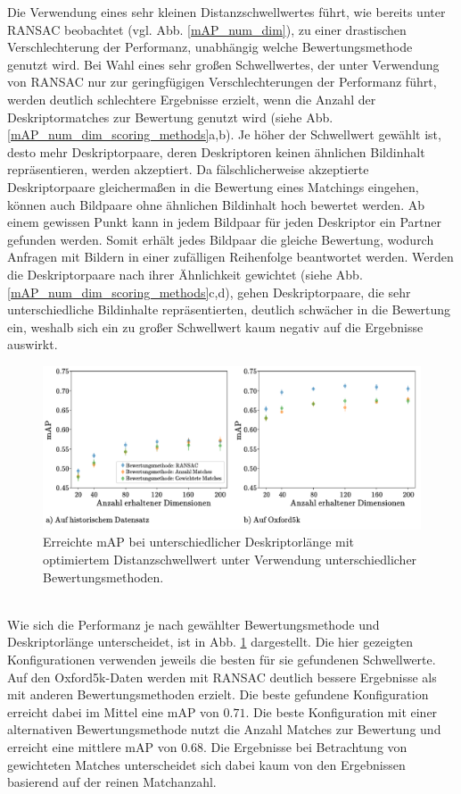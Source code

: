 Die Verwendung eines sehr kleinen Distanzschwellwertes führt, wie bereits unter RANSAC beobachtet (vgl. Abb. \ref{mAP_num_dim}), zu einer drastischen Verschlechterung der Performanz, unabhängig welche Bewertungsmethode genutzt wird. Bei Wahl eines sehr großen Schwellwertes, der unter Verwendung von RANSAC nur zur geringfügigen Verschlechterungen der Performanz führt, werden deutlich schlechtere Ergebnisse erzielt, wenn die Anzahl der Deskriptormatches zur Bewertung genutzt wird (siehe Abb. \ref{mAP_num_dim_scoring_methods}a,b). Je höher der Schwellwert gewählt ist, desto mehr Deskriptorpaare, deren Deskriptoren keinen ähnlichen Bildinhalt repräsentieren, werden akzeptiert. Da fälschlicherweise akzeptierte Deskriptorpaare gleichermaßen in die Bewertung eines Matchings eingehen, können auch Bildpaare ohne ähnlichen Bildinhalt hoch bewertet werden. Ab einem gewissen Punkt kann in jedem Bildpaar für jeden Deskriptor ein Partner gefunden werden. Somit erhält jedes Bildpaar die gleiche Bewertung, wodurch Anfragen mit Bildern in einer zufälligen Reihenfolge beantwortet werden. Werden die Deskriptorpaare nach ihrer Ähnlichkeit gewichtet (siehe Abb. \ref{mAP_num_dim_scoring_methods}c,d), gehen Deskriptorpaare, die sehr unterschiedliche Bildinhalte repräsentierten, deutlich schwächer in die Bewertung ein, weshalb sich ein zu großer Schwellwert kaum negativ auf die Ergebnisse auswirkt.
\begin{figure}[h]
\includegraphics[scale=0.74]{compare_scoring_methods}
\caption{Erreichte mAP bei unterschiedlicher Deskriptorlänge mit optimiertem Distanzschwellwert unter Verwendung unterschiedlicher Bewertungsmethoden.}
\label{compare_scoring_methods}
\end{figure}
\\
Wie sich die Performanz je nach gewählter Bewertungsmethode und Deskriptorlänge unterscheidet, ist in Abb. \ref{compare_scoring_methods} dargestellt. Die hier gezeigten Konfigurationen verwenden jeweils die besten für sie gefundenen Schwellwerte. Auf den Oxford5k-Daten werden mit RANSAC deutlich bessere Ergebnisse als mit anderen Bewertungsmethoden erzielt. Die beste gefundene Konfiguration erreicht dabei im Mittel eine mAP von $0.71$. Die beste Konfiguration mit einer alternativen Bewertungsmethode nutzt die Anzahl Matches zur Bewertung und erreicht eine mittlere mAP von $0.68$. Die Ergebnisse bei Betrachtung von gewichteten Matches unterscheidet sich dabei kaum von den Ergebnissen basierend auf der reinen Matchanzahl.
